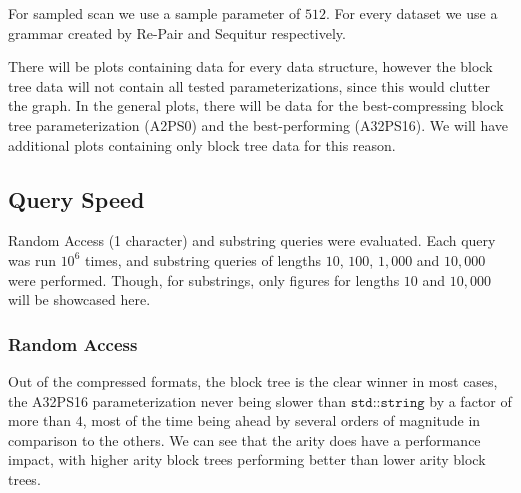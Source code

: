 \documentclass{scrartcl}
\begin{document}
For sampled scan we use a sample parameter of $512$.
For every dataset we use a grammar created by Re-Pair \cite{larsson_off-line_2000} and Sequitur \cite{nevill-manning_identifying_1997} respectively.

There will be plots containing data for every data structure, however the block tree data will not contain all tested parameterizations, since this would clutter the graph.
In the general plots, there will be data for the best-compressing block tree parameterization (A2PS0) and the best-performing (A32PS16).
We will have additional plots containing only block tree data for this reason.


\subsection{Query Speed}

Random Access (1 character) and substring queries were evaluated.
Each query was run $10^6$ times, and substring queries of lengths $10$, $100$, $1,000$ and $10,000$ were performed.
Though, for substrings, only figures for lengths $10$ and $10,000$ will be showcased here.

\subsubsection{Random Access}

Out of the compressed formats, the block tree is the clear winner in most cases, the A32PS16 parameterization never being slower than $\texttt{std::string}$ by a factor of more than $4$,
most of the time being ahead by several orders of magnitude in comparison to the others.
We can see that the arity does have a performance impact, with higher arity block trees performing better than lower arity block trees.
\end{document}

